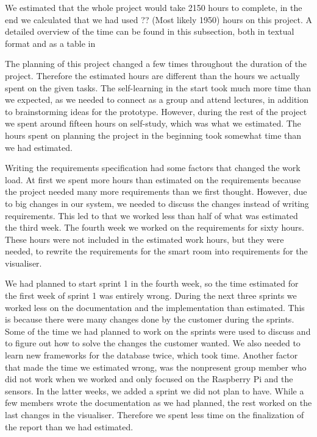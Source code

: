 \documentclass[../document]{subfiles}
\begin{document}
We estimated that the whole project would take 2150 hours to complete, in the end we calculated that we had used {\color{red} ?? (Most likely 1950)} hours on this project. A detailed overview of the time can be found in this subsection, both in textual format and as a table in 


The planning of this project changed a few times throughout the duration of the project. Therefore the estimated hours are different than the hours we actually spent on the given tasks. The self-learning in the start took much more time than we expected, as we needed to connect as a group and attend lectures, in addition to brainstorming ideas for the prototype. However, during the rest of the project we spent around fifteen hours on self-study, which was what we estimated. The hours spent on planning the project in the beginning took somewhat time than we had estimated. 

Writing the requirements specification had some factors that changed the work load. At first we spent more hours than estimated on the requirements because the project needed many more requirements than we first thought. However, due to big changes in our system, we needed to discuss the changes instead of writing requirements. This led to that we worked less than half of what was estimated the third week. The fourth week we worked on the requirements for sixty hours. These hours were not included in the estimated work hours, but they were needed, to rewrite the requirements for the smart room into requirements for the visualiser.

We had planned to start sprint 1 in the fourth week, so the time estimated for the first week of sprint 1 was entirely wrong. During the next three sprints we worked less on the documentation and the implementation than estimated. This is because there were many changes done by the customer during the sprints. Some of the time we had planned to work on the sprints were used to discuss and to figure out how to solve the changes the customer wanted. We also needed to learn new frameworks for the database twice, which took time. Another factor that made the time we estimated wrong, was the nonpresent group member who did not work when we worked and only focused on the Raspberry Pi and the sensors. In the latter weeks, we added a sprint we did not plan to have. While a few members wrote the documentation as we had planned, the rest worked on the last changes in the visualiser. Therefore we spent less time on the finalization of the report than we had estimated. 
\end{document}
